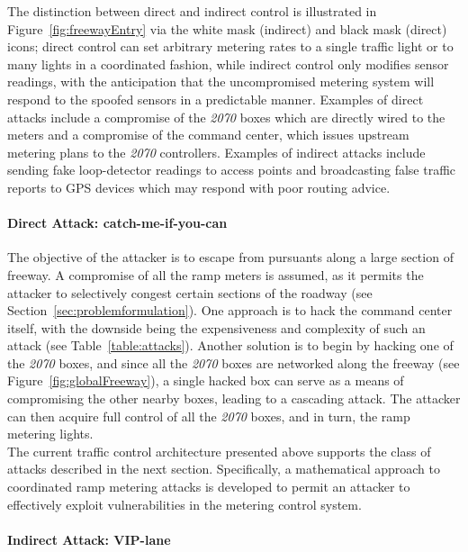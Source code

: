         The distinction between direct and indirect control is illustrated in Figure~\ref{fig:freewayEntry} via the white mask (indirect) and black mask (direct) icons; direct control can set arbitrary metering rates to a single traffic light or to many lights in a coordinated fashion, while indirect control only modifies sensor readings, with the anticipation that the uncompromised metering system will respond to the spoofed sensors in a predictable manner. Examples of direct attacks include a compromise of the \emph{2070} boxes which are directly wired to the meters and a compromise of the command center, which issues upstream metering plans to the \emph{2070} controllers. Examples of indirect attacks include sending fake loop-detector readings to access points and broadcasting false traffic reports to GPS devices which may respond with poor routing advice.

\paragraph{Direct Attack: catch-me-if-you-can}
            \label{sss:catchmescen}
            The objective of the attacker is to escape from pursuants along a large section of freeway. A compromise of all the ramp meters is assumed, as it permits the attacker to selectively congest certain sections of the roadway (see Section~\ref{sec:problemformulation}).  One approach is to hack the command center itself, with the downside being the expensiveness and complexity of such an attack (see Table~\ref{table:attacks}). Another solution is to begin by hacking one of the \emph{2070} boxes, and since all the \emph{2070} boxes are networked along the freeway (see Figure~\ref{fig:globalFreeway}), a single hacked box can serve as a means of compromising the other nearby boxes, leading to a cascading attack. The attacker can then acquire full control of all the \emph{2070} boxes, and in turn, the ramp metering lights.
            \\
            The current traffic control architecture presented above supports the class of attacks described in the next section. Specifically, a mathematical approach to coordinated ramp metering attacks is developed to permit an attacker to effectively exploit vulnerabilities in the metering control system.

\paragraph{Indirect Attack: VIP-lane}

